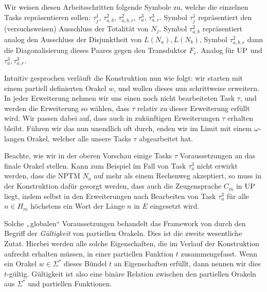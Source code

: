 Wir weisen diesen Arbeitsschritten folgende Symbole zu, welche die einzelnen Tasks repräsentieren sollen: $\tau^1_j$, $\tau^2_{a,b}$, $\tau^2_{a,b,r}$, $\tau^3_a$, $\tau^3_{a,r}$.
Symbol $\tau^1_j$ repräsentiert den (versuchsweisen) Ausschluss der Totalität von $N_j$. Symbol $\tau^2_{a,b}$ repräsentiert analog den Ausschluss der Disjunktheit von $L(N_a), L(N_b)$, Symbol $\tau^2_{a,b,r}$ dann die Diagonalisierung dieses Paares gegen den Transduktor $F_r$. Analog für $\mathrm{UP}$ und $\tau^3_a, \tau^3_{a,r}$.

Intuitiv gesprochen verläuft die Konstruktion nun wie folgt: wir starten mit einem partiell definierten Orakel $w$, und wollen dieses nun schrittweise erweitern. In jeder Erweiterung nehmen wir uns einen noch nicht bearbeiteten Task $\tau$, und werden die Erweiterung so wählen, dass $\tau$ relativ zu dieser Erweiterung erfüllt wird. Wir passen dabei auf, dass auch in zukünftigen Erweiterungen $\tau$ erhalten bleibt.
Führen wir das nun unendlich oft durch, enden wir im Limit mit einem $\omega$-langen Orakel, welcher alle unsere Tasks $\tau$ abgearbeitet hat.

Beachte, wie wir in der oberen Vorschau einige Tasks $\tau$ Voraussetzungen an das finale Orakel stellen. Kann zum Beispiel im Fall von Task $\tau^3_a$ nicht erwirkt werden, dass die NPTM $N_a$ auf mehr als einem Rechenweg akzeptiert, so muss in der Konstruktion dafür gesorgt werden, dass auch die Zeugensprache $C_m$ in $\mathrm{UP}$ liegt, indem selbst in den Erweiterungen nach Bearbeiten von Task $\tau^3_a$ für alle $n\in H_m$ höchstens ein Wort der Länge $n$ in $E$ eingesetzt wird.

Solche „globalen“ Voraussetzungen behandelt das Framework von \citeauthor{dose_np-completeness_2019} durch den Begriff der \emph{Gültigkeit} von partiellen Orakeln. Dies ist die zweite wesentliche Zutat.
Hierbei werden alle solche Eigenschaften, die im Verlauf der Konstruktion aufrecht erhalten müssen, in einer partiellen Funktion $t$ zusammengefasst.
Wenn ein Orakel $w\in\Sigma^*$ dieses Bündel $t$ an Eigenschaften erfüllt, dann nennen wir dies $t$-gültig.
Gültigkeit ist also eine binäre Relation zwischen den partiellen Orakeln aus $\Sigma^*$ und partiellen Funktionen.

